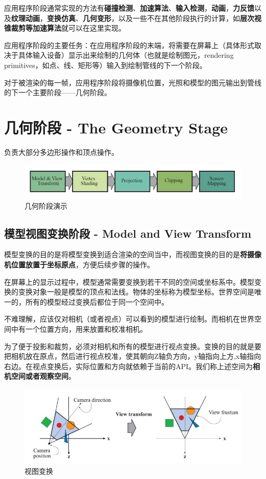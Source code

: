 \documentclass[UTF8,a4paper,12pt]{ctexbook}
\begin{document}
		应用程序阶段通常实现的方法有\textbf{碰撞检测}、\textbf{加速算法}、\textbf{输入检测}，\textbf{动画}，\textbf{力反馈}以及\textbf{纹理动画}，\textbf{变换仿真}、\textbf{几何变形}，以及一些不在其他阶段执行的计算，如\textbf{层次视锥裁剪等加速算法}就可以在这里实现。
		
		应用程序阶段的主要任务：在应用程序阶段的末端，将需要在屏幕上（具体形式取决于具体输入设备）显示出来绘制的几何体（也就是绘制图元，rendering primitives，如点、线、矩形等）输入到绘制管线的下一个阶段。
		
		对于被渲染的每一帧，应用程序阶段将摄像机位置，光照和模型的图元输出到管线的下一个主要阶段——几何阶段。
		
	
	\section{几何阶段 - The Geometry Stage}
		负责大部分多边形操作和顶点操作。
			\begin{figure}[H]
				\centering
				\includegraphics[scale=0.7]{Geometry}
				\caption{几何阶段演示}
			\end{figure}
		\subsection{模型视图变换阶段 - Model and View Transform} 
		
			模型变换的目的是将模型变换到适合渲染的空间当中，而视图变换的目的是\textbf{将摄像机位置放置于坐标原点}，方便后续步骤的操作。
			
			在屏幕上的显示过程中，模型通常需要变换到若干不同的空间或坐标系中。模型变换的变换对象一般是模型的顶点和法线。物体的坐标称为模型坐标。世界空间是唯一的，所有的模型经过变换后都位于同一个空间中。
			
			不难理解，应该仅对相机（或者视点）可以看到的模型进行绘制。而相机在世界空间中有一个位置方向，用来放置和校准相机。
			
			为了便于投影和裁剪，必须对相机和所有的模型进行视点变换。变换的目的就是要把相机放在原点，然后进行视点校准，使其朝向Z轴负方向，y轴指向上方,x轴指向右边。在视点变换后，实际位置和方向就依赖于当前的API。我们称上述空间为\textbf{相机空间或者观察空间}。
		
				\begin{figure}[H]
					\centering
					\includegraphics[scale=0.66]{ModelViewTransform}
					\caption{视图变换}
				\end{figure}
			
\end{document}
